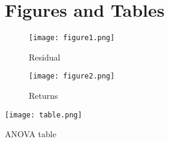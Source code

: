 \documentclass[12pt,english]{article}
\begin{document}
\vfill
\pagebreak{}
\begin{spacing}{1.0}


\end{spacing}

\vfill
\pagebreak{}
\clearpage

\section*{Figures and Tables}\label{sec:figTables}
\begin{figure}[ht]
\centering
\bigskip{}

\texttt{[image: figure1.png]}
\caption{Residual}
\label{fig:figure1}


\texttt{[image: figure2.png]}
\caption{Returns}
\label{fig:figure2}


\end{figure}

\begin{table}[ht]
\centering
\texttt{[image: table.png]}
\caption{ANOVA table}
\label{tab:ANOVA}
\end{table}
\end{document}
